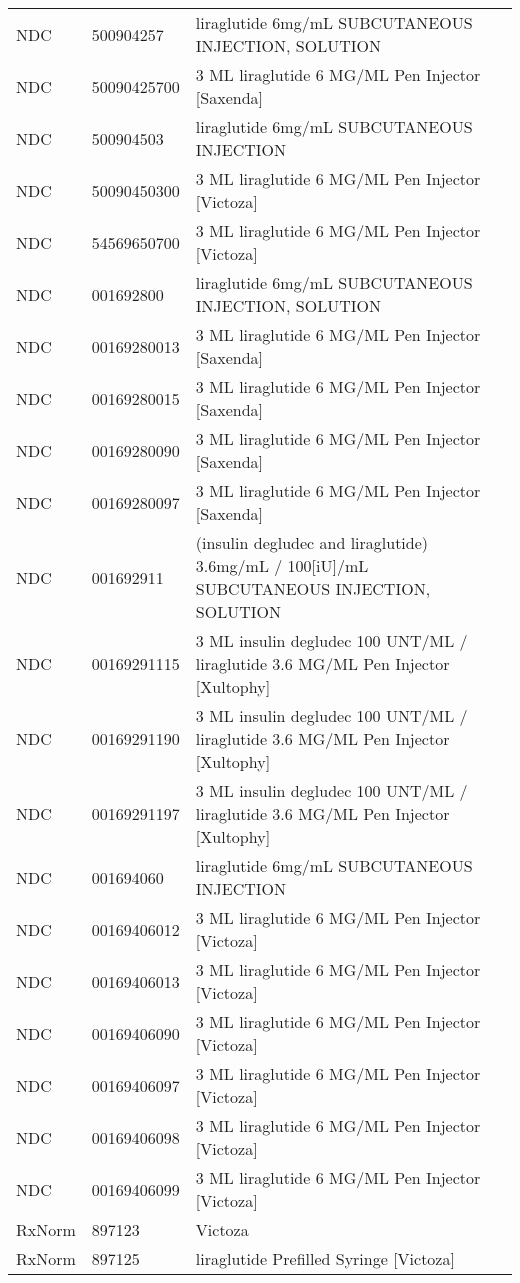 \begin{longtable}{p{}p{}p{}}
  NDC & 500904257 & liraglutide 6mg/mL SUBCUTANEOUS INJECTION, SOLUTION \\ 
  NDC & 50090425700 & 3 ML liraglutide 6 MG/ML Pen Injector [Saxenda] \\ 
  NDC & 500904503 & liraglutide 6mg/mL SUBCUTANEOUS INJECTION \\ 
  NDC & 50090450300 & 3 ML liraglutide 6 MG/ML Pen Injector [Victoza] \\ 
  NDC & 54569650700 & 3 ML liraglutide 6 MG/ML Pen Injector [Victoza] \\ 
  NDC & 001692800 & liraglutide 6mg/mL SUBCUTANEOUS INJECTION, SOLUTION \\ 
  NDC & 00169280013 & 3 ML liraglutide 6 MG/ML Pen Injector [Saxenda] \\ 
  NDC & 00169280015 & 3 ML liraglutide 6 MG/ML Pen Injector [Saxenda] \\ 
  NDC & 00169280090 & 3 ML liraglutide 6 MG/ML Pen Injector [Saxenda] \\ 
  NDC & 00169280097 & 3 ML liraglutide 6 MG/ML Pen Injector [Saxenda] \\ 
  NDC & 001692911 & (insulin degludec and liraglutide) 3.6mg/mL / 100[iU]/mL SUBCUTANEOUS INJECTION, SOLUTION \\ 
  NDC & 00169291115 & 3 ML insulin degludec 100 UNT/ML / liraglutide 3.6 MG/ML Pen Injector [Xultophy] \\ 
  NDC & 00169291190 & 3 ML insulin degludec 100 UNT/ML / liraglutide 3.6 MG/ML Pen Injector [Xultophy] \\ 
  NDC & 00169291197 & 3 ML insulin degludec 100 UNT/ML / liraglutide 3.6 MG/ML Pen Injector [Xultophy] \\ 
  NDC & 001694060 & liraglutide 6mg/mL SUBCUTANEOUS INJECTION \\ 
  NDC & 00169406012 & 3 ML liraglutide 6 MG/ML Pen Injector [Victoza] \\ 
  NDC & 00169406013 & 3 ML liraglutide 6 MG/ML Pen Injector [Victoza] \\ 
  NDC & 00169406090 & 3 ML liraglutide 6 MG/ML Pen Injector [Victoza] \\ 
  NDC & 00169406097 & 3 ML liraglutide 6 MG/ML Pen Injector [Victoza] \\ 
  NDC & 00169406098 & 3 ML liraglutide 6 MG/ML Pen Injector [Victoza] \\ 
  NDC & 00169406099 & 3 ML liraglutide 6 MG/ML Pen Injector [Victoza] \\ 
  RxNorm & 897123 & Victoza \\ 
  RxNorm & 897125 & liraglutide Prefilled Syringe [Victoza] \\ 

\end{longtable}
